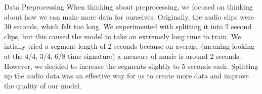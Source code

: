 Data Preprocessing
When thinking about preprocessing, we focused on thinking about how we can make more data for ourselves. Originally, the audio clips were 30
seconds, which felt too long. We experimented with splitting it into 2 second clips, but this caused the model to take an extremely long time
to train. We intially tried a segment length of 2 seconds because on average (meaning looking at the 4/4, 3/4, 6/8 time signature) a measure
of music is around 2 seconds. However, we decided to increase the segments slightly to 5 seconds each. Splitting up the audio data was an 
effective way for us to create more data and improve the quality of our model.
